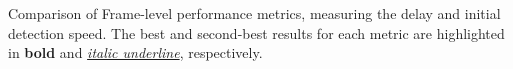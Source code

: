 \begin{table}[htbp]
    \caption{Comparison of Frame-level performance metrics, measuring the delay and initial detection speed. The best and second-best results for each metric are highlighted in \textbf{bold} and \textit{\underline{italic underline}}, respectively.}
    \label{tb:cmp_other_temp_eager}
\end{table}